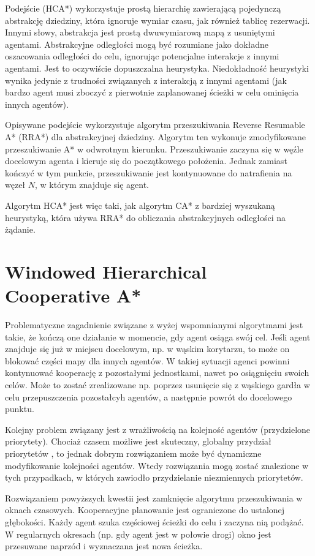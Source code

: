 Podejście (HCA*) wykorzystuje prostą hierarchię zawierającą pojedynczą abstrakcję dziedziny, która ignoruje wymiar czasu, jak również tablicę rezerwacji.
Innymi słowy, abstrakcja jest prostą dwuwymiarową mapą z usuniętymi agentami. Abstrakcyjne odległości mogą być rozumiane jako dokładne oszacowania odległości do celu, ignorując potencjalne interakcje z innymi agentami. Jest to oczywiście dopuszczalna heurystyka. Niedokładność heurystyki wynika jedynie z trudności związanych z interakcją z innymi agentami (jak bardzo agent musi zboczyć z pierwotnie zaplanowanej ścieżki w celu ominięcia innych agentów).

Opisywane podejście wykorzystuje algorytm przeszukiwania Reverse Resumable A* (RRA*) dla abstrakcyjnej dziedziny.
Algorytm ten wykonuje zmodyfikowane przeszukiwanie A* w odwrotnym kierunku. Przeszukiwanie zaczyna się w węźle docelowym agenta i kieruje się do początkowego położenia. Jednak zamiast kończyć w tym punkcie, przeszukiwanie jest kontynuowane do natrafienia na węzeł $N$, w którym znajduje się agent.

Algorytm HCA* jest więc taki, jak algorytm CA* z bardziej wyszukaną heurystyką, która używa RRA* do obliczania abstrakcyjnych odległości na żądanie.

\section{Windowed Hierarchical Cooperative A*}
\label{ch:whca}
Problematyczne zagadnienie związane z wyżej wspomnianymi algorytmami jest takie, że kończą one działanie w momencie, gdy agent osiąga swój cel. Jeśli agent znajduje się już w miejscu docelowym, np. w wąskim korytarzu, to może on blokować części mapy dla innych agentów. W takiej sytuacji agenci powinni kontynuować kooperację z pozostałymi jednostkami, nawet po osiągnięciu swoich celów. Może to zostać zrealizowane np. poprzez usunięcie się z wąskiego gardła w celu przepuszczenia pozostałcyh agentów, a następnie powrót do docelowego punktu. \cite{cooppath}

Kolejny problem związany jest z wrażliwością na kolejność agentów (przydzielone priorytety). Chociaż czasem możliwe jest skuteczny, globalny przydział priorytetów \cite{latombe}, to jednak dobrym rozwiązaniem może być dynamiczne modyfikowanie kolejności agentów. Wtedy rozwiązania mogą zostać znalezione w tych przypadkach, w których zawiodło przydzielanie niezmiennych priorytetów. \cite{cooppath}

Rozwiązaniem powyższych kwestii jest zamknięcie algorytmu przeszukiwania w oknach czasowych.
Kooperacyjne planowanie jest ograniczone do ustalonej głębokości. Każdy agent szuka częściowej ścieżki do celu i zaczyna nią podążać. W regularnych okresach (np. gdy agent jest w połowie drogi) okno jest przesuwane naprzód i wyznaczana jest nowa ścieżka.

